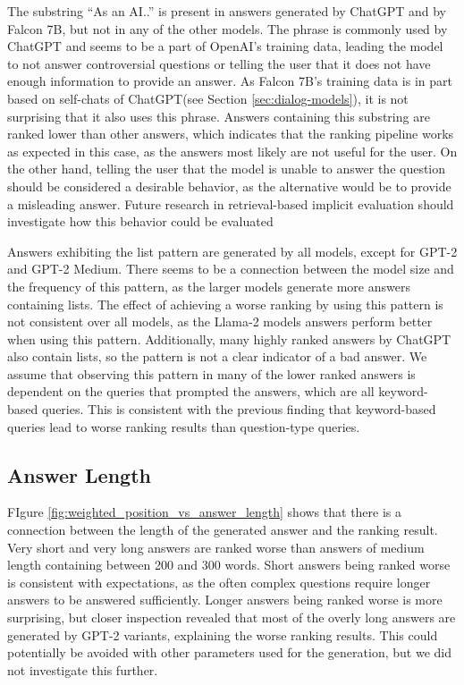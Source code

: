 The substring ``As an AI..'' is present in answers generated by ChatGPT and by Falcon 7B, but not in any of the other models.
The phrase is commonly used by ChatGPT and seems to be a part of OpenAI's training data, leading the model to not answer controversial questions or telling the user that it does not have enough information to provide an answer.
As Falcon 7B's training data is in part based on self-chats of ChatGPT(see Section \ref{sec:dialog-models}), it is not surprising that it also uses this phrase.
Answers containing this substring are ranked lower than other answers, which indicates that the ranking pipeline works as expected in this case, as the answers most likely are not useful for the user.
On the other hand, telling the user that the model is unable to answer the question should be considered a desirable behavior, as the alternative would be to provide a misleading answer.
Future research in retrieval-based implicit evaluation should investigate how this behavior could be evaluated

Answers exhibiting the list pattern are generated by all models, except for GPT-2 and GPT-2 Medium.
There seems to be a connection between the model size and the frequency of this pattern, as the larger models generate more answers containing lists.
The effect of achieving a worse ranking by using this pattern is not consistent over all models, as the Llama-2 models answers perform better when using this pattern.
Additionally, many highly ranked answers by ChatGPT also contain lists, so the pattern is not a clear indicator of a bad answer.
We assume that observing this pattern in many of the lower ranked answers is dependent on the queries that prompted the answers, which are all keyword-based queries.
This is consistent with the previous finding that keyword-based queries lead to worse ranking results than question-type queries.

\subsection{Answer Length}
FIgure \ref{fig:weighted_position_vs_answer_length} shows that there is a connection between the length of the generated answer and the ranking result.
Very short and very long answers are ranked worse than answers of medium length containing between 200 and 300 words.
Short answers being ranked worse is consistent with expectations, as the often complex questions require longer answers to be answered sufficiently.
Longer answers being ranked worse is more surprising, but closer inspection revealed that most of the overly long answers are generated by GPT-2 variants, explaining the worse ranking results.
This could potentially be avoided with other parameters used for the generation, but we did not investigate this further.

